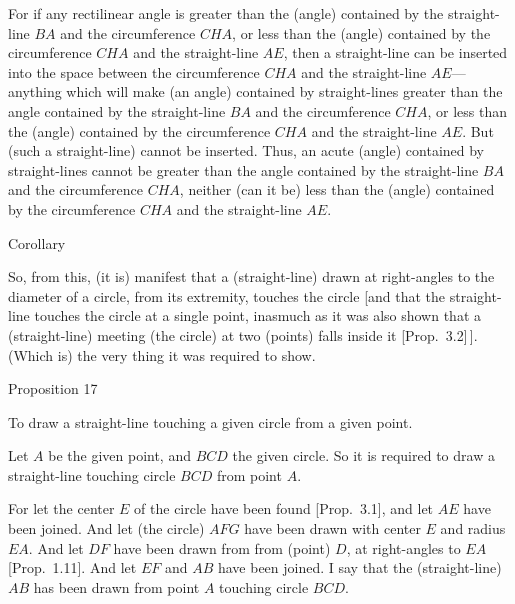 For if any rectilinear angle is greater than the (angle) contained by the
straight-line $BA$ and the circumference $CHA$, or  less than the (angle)
contained by the circumference $CHA$ and the straight-line $AE$, then
a straight-line can be inserted into the space between the circumference 
$CHA$ and the straight-line $AE$---anything which will make (an angle)
contained by straight-lines greater than the angle contained by the straight-line $BA$ and the circumference $CHA$, or less than the (angle) contained 
by the circumference $CHA$ and the straight-line $AE$. But (such a straight-line)
cannot be inserted. Thus, an acute (angle) contained by straight-lines
cannot be greater than the angle contained by the straight-line $BA$ and
the circumference $CHA$, neither (can it be) less than the (angle) contained by
the circumference $CHA$ and the straight-line $AE$.\\

\begin{center}
{\large Corollary}
\end{center}\vspace*{-7pt}

So, from this, (it is) manifest that a (straight-line) drawn at right-angles
to the diameter of a circle, from its extremity, touches the circle [and that the
straight-line  touches the circle at a single point, inasmuch as it was also
shown that a (straight-line) meeting (the circle) at two (points) falls inside it [Prop.~3.2]\,]. (Which is) the very thing it was required to show. 


\begin{center}
{\large Proposition 17}
\end{center}

To draw a straight-line touching a given circle from a given point.

\epsfysize=2.2in
\centerline{}

Let $A$ be the given point, and $BCD$ the given circle. So it is required to draw a
straight-line touching  circle $BCD$ from point $A$.

For let the center $E$ of the circle have been found [Prop.~3.1], and let $AE$ have been joined. And let (the circle) $AFG$ have been drawn with center
$E$ and radius $EA$. And let $DF$ have been drawn from from (point) $D$,
at right-angles to $EA$ [Prop.~1.11]. And let $EF$ and $AB$ have
been joined. I say that the (straight-line) $AB$ has been drawn from  point $A$
touching circle $BCD$.

